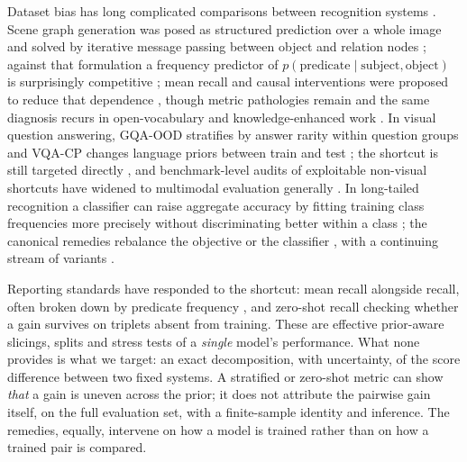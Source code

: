 Dataset bias has long complicated comparisons between recognition systems
\citep{geirhos2020shortcut}. Scene graph generation was posed as structured prediction over
a whole image and solved by iterative message passing between object and relation nodes
\citep{xu2017scene}; against that formulation a frequency
predictor of $p(\text{predicate}\mid\text{subject},\text{object})$ is surprisingly
competitive \citep{zellers2018neural}; mean recall and causal interventions were proposed to
reduce that dependence \citep{tang2020unbiased}, though
metric pathologies remain \citep{li2022rethinking} and the same diagnosis recurs in
open-vocabulary and knowledge-enhanced work
\citep{li2024pixels}. In visual question answering, GQA-OOD
stratifies by answer rarity within question groups \citep{kervadec2021roses} and VQA-CP
changes language priors between train and test \citep{agrawal2018dont}; the shortcut is
still targeted directly \citep{kuang2024debiasing}, and benchmark-level audits of
exploitable non-visual shortcuts have widened to multimodal evaluation generally
\citep{zhou2025shortcut}. In long-tailed recognition a classifier can
raise aggregate accuracy by fitting training class frequencies more precisely without
discriminating better within a class \citep{duan2024longtailed}; the
canonical remedies rebalance the objective or the classifier
\citep{cui2019classbalanced,cao2019learning,menon2021long}, with a
continuing stream of variants \citep{luo2025rebalancing}.

Reporting standards have responded to the shortcut: mean recall alongside recall, often
broken down by predicate frequency \citep{tang2020unbiased,li2022rethinking}, and zero-shot
recall \citep{lu2016visual} checking whether a gain survives on triplets absent from
training. These are effective prior-aware slicings, splits and stress tests of a
\emph{single} model's performance. What none provides is what we target: an exact
decomposition, with uncertainty, of the score difference between two fixed systems. A
stratified or zero-shot metric can show \emph{that} a gain is uneven across the prior; it
does not attribute the pairwise gain itself, on the full evaluation set, with a
finite-sample identity and inference. The remedies, equally, intervene on how a model is
trained rather than on how a trained pair is compared.
